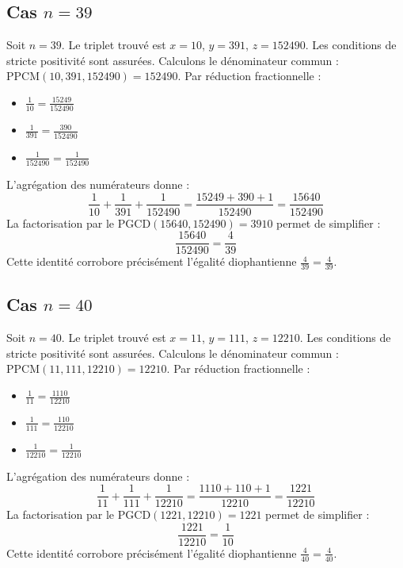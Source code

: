 \documentclass[11pt,a4paper]{article}
\begin{document}
\subsection{Cas $n = 39$}
Soit $n = 39$. Le triplet trouvé est $x = 10$, $y = 391$, $z = 152490$.
Les conditions de stricte positivité sont assurées.
Calculons le dénominateur commun : $\text{PPCM}(10, 391, 152490) = 152490$.
Par réduction fractionnelle :
\begin{itemize}
    \item $\frac{1}{10} = \frac{15249}{152490}$
    \item $\frac{1}{391} = \frac{390}{152490}$
    \item $\frac{1}{152490} = \frac{1}{152490}$
\end{itemize}
L'agrégation des numérateurs donne :
$$ \frac{1}{10} + \frac{1}{391} + \frac{1}{152490} = \frac{15249 + 390 + 1}{152490} = \frac{15640}{152490} $$
La factorisation par le $\text{PGCD}(15640, 152490) = 3910$ permet de simplifier :
$$ \frac{15640}{152490} = \frac{4}{39} $$
Cette identité corrobore précisément l'égalité diophantienne $\frac{4}{39} = \frac{4}{39}$.

\subsection{Cas $n = 40$}
Soit $n = 40$. Le triplet trouvé est $x = 11$, $y = 111$, $z = 12210$.
Les conditions de stricte positivité sont assurées.
Calculons le dénominateur commun : $\text{PPCM}(11, 111, 12210) = 12210$.
Par réduction fractionnelle :
\begin{itemize}
    \item $\frac{1}{11} = \frac{1110}{12210}$
    \item $\frac{1}{111} = \frac{110}{12210}$
    \item $\frac{1}{12210} = \frac{1}{12210}$
\end{itemize}
L'agrégation des numérateurs donne :
$$ \frac{1}{11} + \frac{1}{111} + \frac{1}{12210} = \frac{1110 + 110 + 1}{12210} = \frac{1221}{12210} $$
La factorisation par le $\text{PGCD}(1221, 12210) = 1221$ permet de simplifier :
$$ \frac{1221}{12210} = \frac{1}{10} $$
Cette identité corrobore précisément l'égalité diophantienne $\frac{4}{40} = \frac{4}{40}$.
\end{document}
